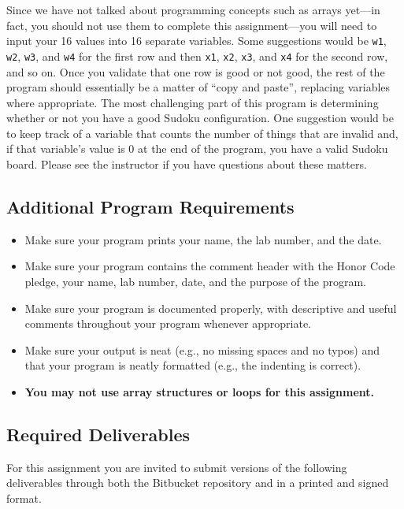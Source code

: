 Since we have not talked about programming concepts such as arrays yet---in fact, you should not use them to complete
this assignment---you will need to input your 16 values into 16 separate variables.  Some suggestions would be {\tt w1},
{\tt w2}, {\tt w3}, and {\tt w4} for the first row and then {\tt x1}, {\tt x2}, {\tt x3}, and {\tt x4} for the second
row, and so on.  Once you validate that one row is good or not good, the rest of the program should essentially be a
matter of ``copy and paste'', replacing variables where appropriate.  The most challenging part of this program is
determining whether or not you have a good Sudoku configuration.  One suggestion would be to keep track of a
variable that counts the number of things that are invalid and, if that variable's value is 0 at the end of the program,
you have a valid Sudoku board. Please see the instructor if you have questions about these matters.

\vspace{-0.2in}
\subsection*{Additional Program Requirements}
\vspace{-0.05in}
\begin{itemize}
\item Make sure your program prints your name, the lab number, and the date. 
\item Make sure your program contains the comment header with the Honor Code pledge, your name, lab number, date, and the purpose of the program. 
\item Make sure your program is documented properly, with descriptive and useful comments throughout your program whenever appropriate. 
\item Make sure your output
  is neat (e.g., no missing spaces and no typos) and that your program is neatly formatted (e.g., the indenting is correct).
\item \textbf{You may not use array structures or loops for this assignment.}
\end{itemize}

\vspace{-0.2in}
\subsection*{Required Deliverables}
\vspace{-0.05in}

For this assignment you are invited to submit versions of the following deliverables through both the Bitbucket
repository and in a printed and signed format.

